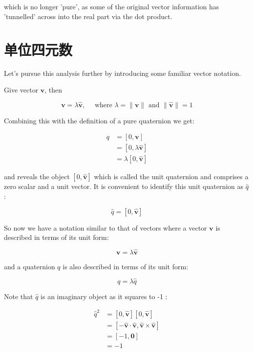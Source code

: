 which is no longer 'pure', as some of the original vector information has 'tunnelled' across into the real part via the dot product.

\section{单位四元数}
Let's pursue this analysis further by introducing some familiar vector notation.

Give vector $\mathbf{v}$, then

$$
    \mathbf{v}=\lambda \hat{\mathbf{v}}, \quad \text { where } \lambda=\|\mathbf{v}\| \text { and }\|\hat{\mathbf{v}}\|=1
$$

Combining this with the definition of a pure quaternion we get:

$$
    \begin{aligned}
        q & =[0, \mathbf{v}]               \\
          & =[0, \lambda \hat{\mathbf{v}}] \\
          & =\lambda[0, \hat{\mathbf{v}}]
    \end{aligned}
$$

and reveals the object $[0, \hat{\mathbf{v}}]$ which is called the unit quaternion and comprises a zero scalar and a unit vector. It is convenient to identify this unit quaternion as $\hat{q}$ :

$$
    \hat{q}=[0, \hat{\mathbf{v}}]
$$

So now we have a notation similar to that of vectors where a vector $\mathbf{v}$ is described in terms of its unit form:

$$
    \mathbf{v}=\lambda \hat{\mathbf{v}}
$$

and a quaternion $q$ is also described in terms of its unit form:

$$
    q=\lambda \hat{q}
$$

Note that $\hat{q}$ is an imaginary object as it squares to -1 :

$$
    \begin{aligned}
        \hat{q}^{2} & =[0, \hat{\mathbf{v}}][0, \hat{\mathbf{v}}]                                           \\
                    & =[-\hat{\mathbf{v}} \cdot \hat{\mathbf{v}}, \hat{\mathbf{v}} \times \hat{\mathbf{v}}] \\
                    & =[-1, \mathbf{0}]                                                                     \\
                    & =-1
    \end{aligned}
$$

